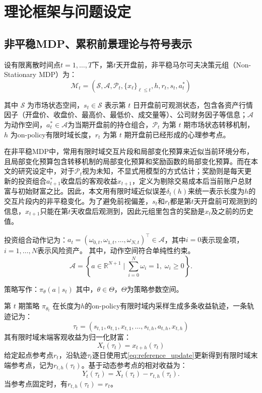 \chapter{理论框架与问题设定}

\section{非平稳MDP、累积前景理论与符号表示}
设有限离散时间点$t=1,\dots,T$下，第$t$天开盘前，非平稳马尔可夫决策元组（Non-Stationary MDP）为：
\begin{equation*}
\mathcal{M}_t=(\mathcal{S},\mathcal{A},\mathcal{P}_t,\{x_\ell\}_{\ell\le t},h,r_t,s_t,a^*_{t})
\end{equation*}

其中 $\mathcal{S}$ 为市场状态空间，$s_t\in \mathcal{S}$ 表示第 $t$ 日开盘前可观测状态，包含各资产行情因子（开盘价、收盘价、最高价、最低价、成交量等）、公司财务因子等信息；$\mathcal{A}$ 为动作空间，$a_{t}^* \in \mathcal{A}$为当期开盘前的持仓组合，$\mathcal{P}_t$ 为第 $t$ 期市场状态转移机制，$h$ 为on-policy有限时域长度，$r_t$ 为第 $t$ 期开盘前已经形成的心理参考点。

在非平稳MDP中，常用有限时域交互片段和局部变化预算来近似当前环境分布，且局部变化预算包含转移机制的局部变化预算和奖励函数的局部变化预算\citep{feng2023nonstationary}。而在本文的研究设定中，对于$\mathcal{P}_t$视为未知，不显式用模型的方式估计；奖励则是每天更新的投资组合$a_{t+1}^*$收盘后的客观收益$x_{t+1}$，定义为剔除交易成本后当前账户总财富与初始财富之比。因此，本文用有限时域近似误差$\delta_t(h)$来统一表示长度为$h$的交互片段内的非平稳变化。为了避免前视偏差，$s_t$和$r_t$都是第$t$天开盘前可观测到的信息，$x_{t+1}$只能在第$t$天收盘后观测到，因此元组里包含的奖励是$x_{t}$及之前的历史值。

投资组合动作记为：$a_t=(\omega_{0,t},\omega_{1,t},\ldots,\omega_{N,t})^\top\in \mathcal{A}$，其中$i=0$表示现金项，$i=1,\dots,N$表示风险资产。
其中，动作空间符合单纯性约束。
\begin{equation*}
\mathcal{A}=\left\{a\in \mathbb{R}^{N+1} \mid \sum_{i=0}^N \omega_i=1,\; \omega_i\ge 0\right\}.
\end{equation*}

策略写作：$\pi_\theta(a\mid s_t)$
其中，$\theta\in\Theta$，$\Theta$为策略参数空间。

第 $t$ 期策略 $\pi_{\theta_t}$ 在长度为$h$的on-policy有限时域内采样生成多条收益轨迹，一条轨迹记为：
\begin{equation*}
\tau_t=(s_{t,1},a_{t,1},x_{t,1},\ldots,s_{t,h},a_{t,h},x_{t,h})
\end{equation*}
其有限时域末端客观收益为归一化财富：
\begin{equation}
X_t(\tau_t)=x_{t+h}(\tau_t)
\end{equation}
给定起点参考点$r_t$，沿轨迹$\tau_t$逐日使用式\eqref{eq:reference_update}更新得到有限时域末端参考点，记为$r_{t,h}(\tau_t)$。基于动态参考点的相对收益为：
\begin{equation}
Y_t(\tau_t)=X_t(\tau_t)-r_{t,h}(\tau_t).
\end{equation}
当参考点固定时，有$r_{t,h}(\tau_t)=r_t$。

